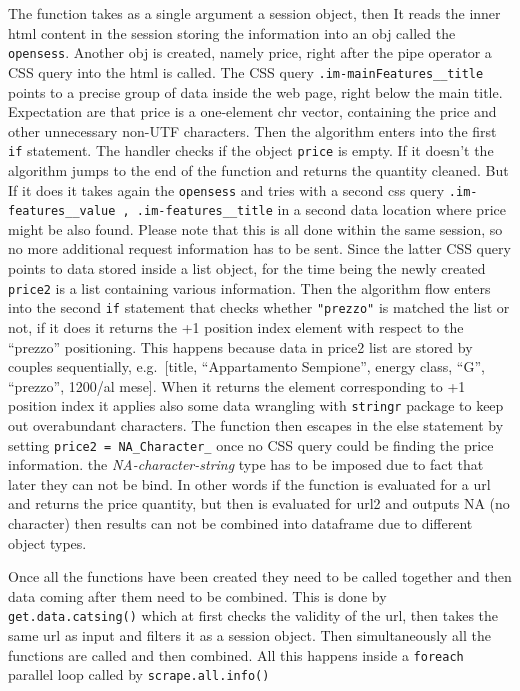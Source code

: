 \documentclass[
  12pt,
  a4paper,
  oneside]{book}
\theoremstyle{definition}
\theoremstyle{definition}
\theoremstyle{definition}
\theoremstyle{remark}
\begin{document}
The function takes as a single argument a session object, then It reads the inner html content in the session storing the information into an obj called the \texttt{opensess}. Another obj is created, namely price, right after the pipe operator a CSS query into the html is called. The CSS query \texttt{.im-mainFeatures\_\_title} points to a precise group of data inside the web page, right below the main title. Expectation are that price is a one-element chr vector, containing the price and other unnecessary non-UTF characters. Then the algorithm enters into the first \texttt{if} statement. The handler checks if the object \texttt{price} is empty. If it doesn't the algorithm jumps to the end of the function and returns the quantity cleaned. But If it does it takes again the \texttt{opensess} and tries with a second css query \texttt{.im-features\_\_value\ ,\ .im-features\_\_title} in a second data location where price might be also found. Please note that this is all done within the same session, so no more additional request information has to be sent. Since the latter CSS query points to data stored inside a list object, for the time being the newly created \texttt{price2} is a list containing various information. Then the algorithm flow enters into the second \texttt{if} statement that checks whether \texttt{"prezzo"} is matched the list or not, if it does it returns the +1 position index element with respect to the ``prezzo'' positioning. This happens because data in price2 list are stored by couples sequentially, e.g.~{[}title, ``Appartamento Sempione'', energy class, ``G'', ``prezzo'', 1200/al mese{]}. When it returns the element corresponding to +1 position index it applies also some data wrangling with \texttt{stringr} package to keep out overabundant characters. The function then escapes in the else statement by setting \texttt{price2\ =\ NA\_Character\_} once no CSS query could be finding the price information. the \emph{NA-character-string} type has to be imposed due to fact that later they can not be bind. In other words if the function is evaluated for a url and returns the price quantity, but then is evaluated for url2 and outputs NA (no character) then results can not be combined into dataframe due to different object types.

Once all the functions have been created they need to be called together and then data coming after them need to be combined. This is done by \texttt{get.data.catsing()} which at first checks the validity of the url, then takes the same url as input and filters it as a session object. Then simultaneously all the functions are called and then combined. All this happens inside a \texttt{foreach} parallel loop called by \texttt{scrape.all.info()}
\end{document}
